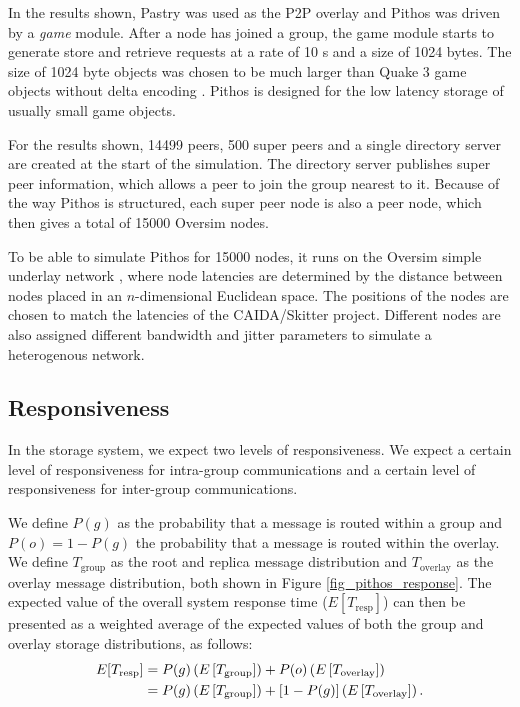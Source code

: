 \documentclass[10pt,a4paper,conference]{IEEEtran}
\begin{document}
In the results shown, Pastry was used as the P2P overlay and Pithos was driven by a \emph{game} module. After a node has joined a group, the game
module starts to generate store and retrieve requests at a rate of 10 s and a size of 1024 bytes. The size of 1024 byte objects was chosen to be much
larger than Quake 3 game objects without delta encoding \cite{Bharambe_Donnybrook}. Pithos is designed for the low latency storage of usually small
game objects.

For the results shown, 14499 peers, 500 super peers and a single directory server are created at the start of the simulation. The directory server
publishes super peer information, which allows a peer to join the group nearest to it. Because of the way Pithos is structured, each super peer node
is also a peer node, which then gives a total of 15000 Oversim nodes.

To be able to simulate Pithos for 15000 nodes, it runs on the Oversim simple underlay network \cite{oversim_applications}, where node latencies are
determined by the distance between nodes placed in an $n$-dimensional Euclidean space. The positions of the nodes are chosen to match the latencies
of the CAIDA/Skitter project. Different nodes are also assigned different bandwidth and jitter parameters to simulate a heterogenous network.

\subsection{Responsiveness}

In the storage system, we expect two levels of responsiveness. We expect a certain level of responsiveness for intra-group communications and a
certain level of responsiveness for inter-group communications.

We define $P(g)$ as the probability that a message is routed within a group and $P(o) = 1 - P(g)$ the probability that a message is routed within the
overlay. We define $T_{\textrm{group}}$ as the root and replica message distribution and $T_{\textrm{overlay}}$ as the overlay message distribution,
both shown in Figure \ref{fig_pithos_response}. The expected value of the overall system response time ($E[T_{\textrm{resp}}]$) can then be presented
as a weighted average of the expected values of both the group and overlay storage distributions, as follows:
%
\begin{align}
    E[T_{\textrm{resp}}] &= P(g)\left(E\left[T_{\textrm{group}}\right]\right) + P(o)\left(E\left[T_{\textrm{overlay}}\right]\right)\notag\\
                         &= P(g)\left(E\left[T_{\textrm{group}}\right]\right) + \left[1 - P(g)\right]\left(E\left[T_{\textrm{overlay}}\right]\right).\label{expected_response_time}
\end{align}
\end{document}

